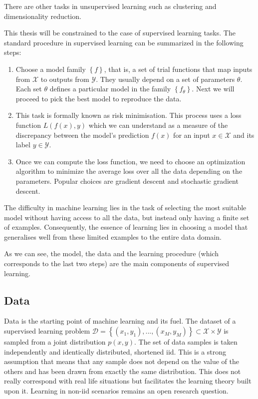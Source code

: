 There are other tasks in unsupervised learning such as clustering and dimensionality reduction.

This thesis will be constrained to the case of supervised learning tasks. The standard procedure in supervised learning can be summarized in the following steps:
\begin{enumerate}
    \item Choose a model family $\left\lbrace f \right\rbrace$, that is, a set of trial functions that map inputs from $\mathcal{X}$ to outputs from $\mathcal{Y}$. They usually depend on a set of parameters $\theta$. Each set $\theta$ defines a particular model in the family $\left\lbrace f_{\theta}\right\rbrace$. Next we will proceed to pick the best model to reproduce the data.

    \item This task is formally known as risk minimisation. This process uses a loss function $L(f(x),y)$ which we can understand as a measure of the discrepancy between the model's prediction $f(x)$ for an input $x\in \mathcal{X}$ and its label $y \in \mathcal{Y}$. 

    \item Once we can compute the loss function, we need to choose an optimization algorithm to minimize the average loss over all the data depending on the parameters. Popular choices are gradient descent and stochastic gradient descent.
\end{enumerate}

The difficulty in machine learning lies in the task of selecting the most suitable model without having access to all the data, but instead only having a finite set of examples. Consequently, the essence of learning lies in choosing a model that generalises well from these limited examples to the entire data domain.

As we can see, the model, the data and the learning procedure (which corresponds to the last two steps) are the main components of supervised learning.

\subsection{Data}
Data is the starting point of machine learning and its fuel. The dataset of a supervised learning problem  ${\mathcal{D} = \left\lbrace (x_1,y_1),...,(x_M,y_M)\right\rbrace \subset \mathcal{X} \times \mathcal{Y}}$ is sampled from a joint distribution $p(x,y)$. The set of data samples is taken independently and identically distributed, shortened iid. This is a strong assumption that means that any sample does not depend on the value of the others and has been drawn from exactly the same distribution. This does not really correspond with real life situations but facilitates the learning theory built upon it. Learning in non-iid scenarios remains an open research question. 

